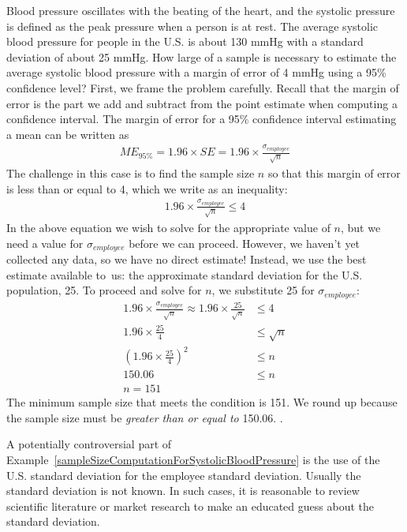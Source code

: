 \begin{example}{Blood pressure oscillates with the beating of the heart, and the systolic pressure is defined as the peak pressure when a person is at rest. The average systolic blood pressure for people in the U.S. is about 130 mmHg with a standard deviation of about 25 mmHg. How large of a sample is necessary to estimate the average systolic blood pressure with a margin of error of 4 mmHg using a 95\% confidence level?}
\label{sampleSizeComputationForSystolicBloodPressure}
First, we frame the problem carefully. Recall that the margin of error is the part we add and subtract from the point estimate when computing a confidence interval. The margin of error for a 95\% confidence interval estimating a mean can be written as
\begin{align*}
ME_{95\%} = 1.96\times SE = 1.96\times\frac{\sigma_{employee}}{\sqrt{n}}
\end{align*}
The challenge in this case is to find the sample size $n$ so that this margin of error is less than or equal to 4, which we write as an inequality:
\begin{align*}
1.96\times \frac{\sigma_{employee}}{\sqrt{n}} \leq 4
\end{align*}
In the above equation we wish to solve for the appropriate value of $n$, but we need a value for $\sigma_{employee}$ before we can proceed. However, we haven't yet collected any data, so we have no direct estimate! Instead, we use the best estimate available to~us: the approximate standard deviation for the U.S. population, 25. To proceed and solve for $n$, we substitute 25 for $\sigma_{employee}$:
\begin{align*}
1.96\times \frac{\sigma_{employee}}{\sqrt{n}} \approx 1.96\times\frac{25}{\sqrt{n}}
	&\leq 4 \\
1.96\times\frac{25}{4} &\leq \sqrt{n} \\
\left(1.96\times\frac{25}{4}\right)^2 &\leq n \\
150.06 &\leq n \\
 n = 151
\end{align*}
The minimum sample size that meets the condition is 151. We round up because the sample size must be \emph{greater than or equal to} 150.06. .
\end{example}

A potentially controversial part of Example~\ref{sampleSizeComputationForSystolicBloodPressure} is the use of the U.S. standard deviation for the employee standard deviation. Usually the standard deviation is not known. In such cases, it is reasonable to review scientific literature or market research to make an educated guess about the standard deviation.

